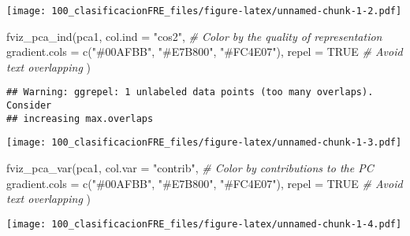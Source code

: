 \documentclass[
]{article}
\newenvironment{Shaded}{\begin{snugshade}}{\end{snugshade}}
\newcommand{\AttributeTok}[1]{\textcolor[rgb]{0.77,0.63,0.00}{#1}}
\newcommand{\CommentTok}[1]{\textcolor[rgb]{0.56,0.35,0.01}{\textit{#1}}}
\newcommand{\ConstantTok}[1]{\textcolor[rgb]{0.00,0.00,0.00}{#1}}
\newcommand{\FunctionTok}[1]{\textcolor[rgb]{0.00,0.00,0.00}{#1}}
\newcommand{\NormalTok}[1]{#1}
\newcommand{\StringTok}[1]{\textcolor[rgb]{0.31,0.60,0.02}{#1}}
\begin{document}
\texttt{[image: 100\_clasificacionFRE\_files/figure-latex/unnamed-chunk-1-2.pdf]}

\begin{Shaded}
\begin{Highlighting}[]
\FunctionTok{fviz\_pca\_ind}\NormalTok{(pca1,}
             \AttributeTok{col.ind =} \StringTok{"cos2"}\NormalTok{, }\CommentTok{\# Color by the quality of representation}
             \AttributeTok{gradient.cols =} \FunctionTok{c}\NormalTok{(}\StringTok{"\#00AFBB"}\NormalTok{, }\StringTok{"\#E7B800"}\NormalTok{, }\StringTok{"\#FC4E07"}\NormalTok{),}
             \AttributeTok{repel =} \ConstantTok{TRUE}     \CommentTok{\# Avoid text overlapping}
\NormalTok{)}
\end{Highlighting}
\end{Shaded}

\begin{verbatim}
## Warning: ggrepel: 1 unlabeled data points (too many overlaps). Consider
## increasing max.overlaps
\end{verbatim}

\texttt{[image: 100\_clasificacionFRE\_files/figure-latex/unnamed-chunk-1-3.pdf]}

\begin{Shaded}
\begin{Highlighting}[]
\FunctionTok{fviz\_pca\_var}\NormalTok{(pca1,}
             \AttributeTok{col.var =} \StringTok{"contrib"}\NormalTok{, }\CommentTok{\# Color by contributions to the PC}
             \AttributeTok{gradient.cols =} \FunctionTok{c}\NormalTok{(}\StringTok{"\#00AFBB"}\NormalTok{, }\StringTok{"\#E7B800"}\NormalTok{, }\StringTok{"\#FC4E07"}\NormalTok{),}
             \AttributeTok{repel =} \ConstantTok{TRUE}     \CommentTok{\# Avoid text overlapping}
\NormalTok{)}
\end{Highlighting}
\end{Shaded}

\texttt{[image: 100\_clasificacionFRE\_files/figure-latex/unnamed-chunk-1-4.pdf]}
\end{document}
